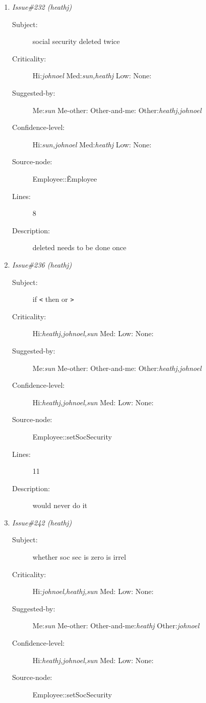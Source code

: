\begin{enumerate}
\begin{description}
\item [Lines:] 7

\item [Description:] not nedded code
\end{description}
\item {\it Issue\#232 (heathj)}
\begin{description}
\item [Subject:] social security deleted twice
\item [Criticality:] Hi:{\it johnoel} Med:{\it sun,heathj} Low:{\it } None:{\it }
\item [Suggested-by:] Me:{\it sun} Me-other:{\it } Other-and-me:{\it } Other:{\it heathj,johnoel}
\item [Confidence-level:] Hi:{\it sun,johnoel} Med:{\it heathj} Low:{\it } None:{\it }
\item [Source-node:] Employee::\~Employee

\item [Lines:] 8

\item [Description:] deleted needs to be done once
\end{description}
\item {\it Issue\#236 (heathj)}
\begin{description}
\item [Subject:] if {\tt <} then or {\tt >}
\item [Criticality:] Hi:{\it heathj,johnoel,sun} Med:{\it } Low:{\it } None:{\it }
\item [Suggested-by:] Me:{\it sun} Me-other:{\it } Other-and-me:{\it } Other:{\it heathj,johnoel}
\item [Confidence-level:] Hi:{\it heathj,johnoel,sun} Med:{\it } Low:{\it } None:{\it }
\item [Source-node:] Employee::setSocSecurity

\item [Lines:] 11

\item [Description:] would never do it
\end{description}
\item {\it Issue\#242 (heathj)}
\begin{description}
\item [Subject:] whether soc sec is zero is irrel
\item [Criticality:] Hi:{\it johnoel,heathj,sun} Med:{\it } Low:{\it } None:{\it }
\item [Suggested-by:] Me:{\it sun} Me-other:{\it } Other-and-me:{\it heathj} Other:{\it johnoel}
\item [Confidence-level:] Hi:{\it heathj,johnoel,sun} Med:{\it } Low:{\it } None:{\it }
\item [Source-node:] Employee::setSocSecurity


\end{description}
\end{enumerate}
